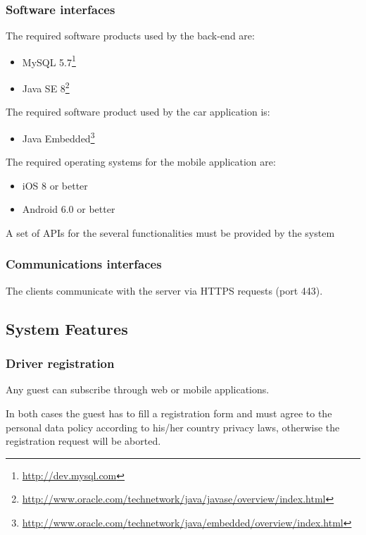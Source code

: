 \begin{itemize}
\subsubsection{Software interfaces}
The required software products used by the back-end are:
\begin{itemize}
	\item MySQL 5.7\footnote{\url{http://dev.mysql.com}}
	\item Java SE 8\footnote{\url{http://www.oracle.com/technetwork/java/javase/overview/index.html}}
\end{itemize}
The required software product used by the car application is:
\begin{itemize}
	\item Java Embedded\footnote{\url{http://www.oracle.com/technetwork/java/embedded/overview/index.html}}
\end{itemize}
The required operating systems for the mobile application are:
\begin{itemize}
	\item iOS 8 or better
	\item Android 6.0 or better
\end{itemize}

A set of APIs for the several functionalities must be provided by the system
	
\subsubsection{Communications interfaces}
The clients communicate with the server via HTTPS requests (port 443).

\end{itemize}

\subsection{System Features}

\subsubsection{Driver registration}

Any guest can subscribe through web or mobile applications.

In both cases the guest has to fill a registration form and must agree to the personal data policy according to his/her country privacy laws, otherwise the registration request will be aborted.


